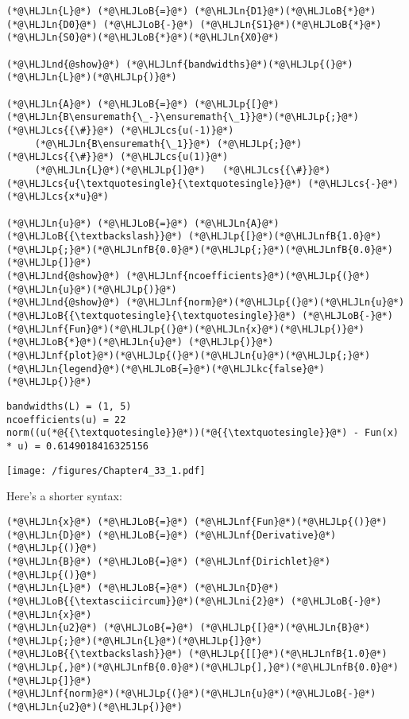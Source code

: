 \documentclass[12pt,landscape]{article}
\newcommand{\HLJLkc}[1]{\textcolor[RGB]{59,151,46}{\textit{#1}}}
\newcommand{\HLJLn}[1]{#1}
\newcommand{\HLJLnd}[1]{\textcolor[RGB]{214,102,97}{#1}}
\newcommand{\HLJLnf}[1]{\textcolor[RGB]{66,102,213}{#1}}
\newcommand{\HLJLnfB}[1]{\textcolor[RGB]{59,151,46}{#1}}
\newcommand{\HLJLni}[1]{\textcolor[RGB]{59,151,46}{#1}}
\newcommand{\HLJLoB}[1]{\textcolor[RGB]{102,102,102}{\textbf{#1}}}
\newcommand{\HLJLp}[1]{#1}
\newcommand{\HLJLcs}[1]{\textcolor[RGB]{153,153,119}{\textit{#1}}}
\begin{document}
{\begin{lstlisting}
(*@\HLJLn{L}@*) (*@\HLJLoB{=}@*) (*@\HLJLn{D1}@*)(*@\HLJLoB{*}@*)(*@\HLJLn{D0}@*) (*@\HLJLoB{-}@*) (*@\HLJLn{S1}@*)(*@\HLJLoB{*}@*)(*@\HLJLn{S0}@*)(*@\HLJLoB{*}@*)(*@\HLJLn{X0}@*)

(*@\HLJLnd{@show}@*) (*@\HLJLnf{bandwidths}@*)(*@\HLJLp{(}@*)(*@\HLJLn{L}@*)(*@\HLJLp{)}@*)

(*@\HLJLn{A}@*) (*@\HLJLoB{=}@*) (*@\HLJLp{[}@*)(*@\HLJLn{B\ensuremath{\_-}\ensuremath{\_1}}@*)(*@\HLJLp{;}@*)   (*@\HLJLcs{{\#}}@*) (*@\HLJLcs{u(-1)}@*)
     (*@\HLJLn{B\ensuremath{\_1}}@*) (*@\HLJLp{;}@*)   (*@\HLJLcs{{\#}}@*) (*@\HLJLcs{u(1)}@*)
     (*@\HLJLn{L}@*)(*@\HLJLp{]}@*)   (*@\HLJLcs{{\#}}@*) (*@\HLJLcs{u{\textquotesingle}{\textquotesingle}}@*) (*@\HLJLcs{-}@*) (*@\HLJLcs{x*u}@*)

(*@\HLJLn{u}@*) (*@\HLJLoB{=}@*) (*@\HLJLn{A}@*) (*@\HLJLoB{{\textbackslash}}@*) (*@\HLJLp{[}@*)(*@\HLJLnfB{1.0}@*)(*@\HLJLp{;}@*)(*@\HLJLnfB{0.0}@*)(*@\HLJLp{;}@*)(*@\HLJLnfB{0.0}@*)(*@\HLJLp{]}@*)
(*@\HLJLnd{@show}@*) (*@\HLJLnf{ncoefficients}@*)(*@\HLJLp{(}@*)(*@\HLJLn{u}@*)(*@\HLJLp{)}@*)
(*@\HLJLnd{@show}@*) (*@\HLJLnf{norm}@*)(*@\HLJLp{(}@*)(*@\HLJLn{u}@*)(*@\HLJLoB{{\textquotesingle}{\textquotesingle}}@*) (*@\HLJLoB{-}@*) (*@\HLJLnf{Fun}@*)(*@\HLJLp{(}@*)(*@\HLJLn{x}@*)(*@\HLJLp{)}@*)(*@\HLJLoB{*}@*)(*@\HLJLn{u}@*) (*@\HLJLp{)}@*)
(*@\HLJLnf{plot}@*)(*@\HLJLp{(}@*)(*@\HLJLn{u}@*)(*@\HLJLp{;}@*) (*@\HLJLn{legend}@*)(*@\HLJLoB{=}@*)(*@\HLJLkc{false}@*)(*@\HLJLp{)}@*)
\end{lstlisting}

\begin{lstlisting}
bandwidths(L) = (1, 5)
ncoefficients(u) = 22
norm((u(*@{{\textquotesingle}}@*))(*@{{\textquotesingle}}@*) - Fun(x) * u) = 0.6149018416325156
\end{lstlisting}

\texttt{[image: /figures/Chapter4\_33\_1.pdf]}

Here's a shorter syntax:


\begin{lstlisting}
(*@\HLJLn{x}@*) (*@\HLJLoB{=}@*) (*@\HLJLnf{Fun}@*)(*@\HLJLp{()}@*)
(*@\HLJLn{D}@*) (*@\HLJLoB{=}@*) (*@\HLJLnf{Derivative}@*)(*@\HLJLp{()}@*)
(*@\HLJLn{B}@*) (*@\HLJLoB{=}@*) (*@\HLJLnf{Dirichlet}@*)(*@\HLJLp{()}@*)
(*@\HLJLn{L}@*) (*@\HLJLoB{=}@*) (*@\HLJLn{D}@*)(*@\HLJLoB{{\textasciicircum}}@*)(*@\HLJLni{2}@*) (*@\HLJLoB{-}@*) (*@\HLJLn{x}@*)
(*@\HLJLn{u2}@*) (*@\HLJLoB{=}@*) (*@\HLJLp{[}@*)(*@\HLJLn{B}@*)(*@\HLJLp{;}@*)(*@\HLJLn{L}@*)(*@\HLJLp{]}@*) (*@\HLJLoB{{\textbackslash}}@*) (*@\HLJLp{[[}@*)(*@\HLJLnfB{1.0}@*)(*@\HLJLp{,}@*)(*@\HLJLnfB{0.0}@*)(*@\HLJLp{],}@*)(*@\HLJLnfB{0.0}@*)(*@\HLJLp{]}@*)
(*@\HLJLnf{norm}@*)(*@\HLJLp{(}@*)(*@\HLJLn{u}@*)(*@\HLJLoB{-}@*)(*@\HLJLn{u2}@*)(*@\HLJLp{)}@*)
\end{lstlisting}

}
\end{document}
